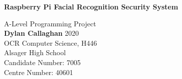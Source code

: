 \documentclass[9pt]{article}
\begin{document}
	
	\begin{titlepage}
		\begin{center}
			\vspace*{1cm}
			
			\Huge
			\textbf{Raspberry Pi Facial Recognition Security System}
			
			\vspace{0.5cm}
			\normalsize
			A-Level Programming Project
			\vspace{1.5cm} \\
			\textbf{Dylan Callaghan}
			\vfill
			\vspace{0.8cm}
			\normalsize
			2020\\
			OCR Computer Science, H446\\
			Alsager High School\\
			Candidate Number: 7005\\
			Centre Number: 40601
		\end{center}
	\end{titlepage}
\tableofcontents






\newpage
\pagestyle{fancy}
\end{document}
